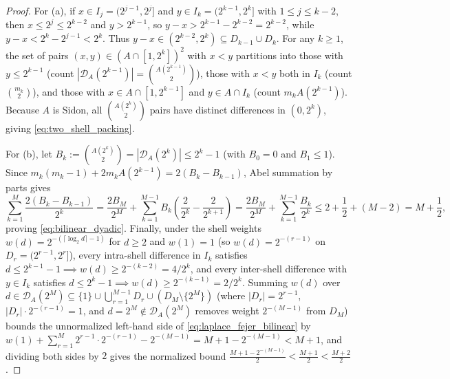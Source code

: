 \documentclass[11pt,reqno]{amsart}
\theoremstyle{definition}
\theoremstyle{remark}
\begin{document}
\begin{proof}
For (a), if $x \in I_j = (2^{j-1}, 2^j]$ and $y \in I_k = (2^{k-1}, 2^k]$ with $1 \le j \le k - 2$, then $x \le 2^j \le 2^{k-2}$ and $y > 2^{k-1}$, so $y - x > 2^{k-1} - 2^{k-2} = 2^{k-2}$, while $y - x < 2^k - 2^{j-1} < 2^k$. Thus $y - x \in (2^{k-2}, 2^k) \subseteq D_{k-1} \cup D_k$. For any $k \ge 1$, the set of pairs $(x, y) \in (A \cap [1, 2^k])^2$ with $x < y$ partitions into those with $y \le 2^{k-1}$ (count $|\mathcal{D}_A(2^{k-1})| = \binom{A(2^{k-1})}{2}$), those with $x < y$ both in $I_k$ (count $\binom{m_k}{2}$), and those with $x \in A \cap [1, 2^{k-1}]$ and $y \in A \cap I_k$ (count $m_k A(2^{k-1})$). Because $A$ is Sidon, all $\binom{A(2^k)}{2}$ pairs have distinct differences in $(0, 2^k)$, giving \eqref{eq:two_shell_packing}.

For (b), let $B_k := \binom{A(2^k)}{2} = |\mathcal{D}_A(2^k)| \le 2^k - 1$ (with $B_0 = 0$ and $B_1 \le 1$). Since $m_k(m_k-1) + 2 m_k A(2^{k-1}) = 2(B_k - B_{k-1})$, Abel summation by parts gives
\[
  \sum_{k=1}^M \frac{2(B_k - B_{k-1})}{2^k} = \frac{2 B_M}{2^M} + \sum_{k=1}^{M-1} B_k\left(\frac{2}{2^k} - \frac{2}{2^{k+1}}\right) = \frac{2 B_M}{2^M} + \sum_{k=1}^{M-1} \frac{B_k}{2^k} \le 2 + \frac{1}{2} + (M - 2) = M + \frac{1}{2},
\]
proving \eqref{eq:bilinear_dyadic}. Finally, under the shell weights $w(d) = 2^{-(\lceil \log_2 d \rceil - 1)}$ for $d \ge 2$ and $w(1) = 1$ (so $w(d) = 2^{-(r-1)}$ on $D_r = (2^{r-1}, 2^r]$), every intra-shell difference in $I_k$ satisfies $d \le 2^{k-1}-1 \implies w(d) \ge 2^{-(k-2)} = 4 / 2^k$, and every inter-shell difference with $y \in I_k$ satisfies $d \le 2^k - 1 \implies w(d) \ge 2^{-(k-1)} = 2 / 2^k$. Summing $w(d)$ over $d \in \mathcal{D}_A(2^M) \subseteq \{1\} \cup \bigcup_{r=1}^{M-1} D_r \cup (D_M \setminus \{2^M\})$ (where $|D_r| = 2^{r-1}$, $|D_r|\cdot 2^{-(r-1)} = 1$, and $d = 2^M \notin \mathcal{D}_A(2^M)$ removes weight $2^{-(M-1)}$ from $D_M$) bounds the unnormalized left-hand side of \eqref{eq:laplace_fejer_bilinear} by $w(1) + \sum_{r=1}^M 2^{r-1} \cdot 2^{-(r-1)} - 2^{-(M-1)} = M + 1 - 2^{-(M-1)} < M + 1$, and dividing both sides by $2$ gives the normalized bound $\frac{M + 1 - 2^{-(M-1)}}{2} < \frac{M + 1}{2} < \frac{M + 2}{2}$.
\end{proof}
\end{document}
